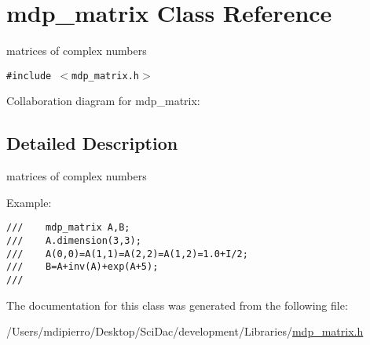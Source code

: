 \hypertarget{classmdp__matrix}{
\section{mdp\_\-matrix Class Reference}
\label{classmdp__matrix}
}
matrices of complex numbers  


{\tt \#include $<$mdp\_\-matrix.h$>$}

Collaboration diagram for mdp\_\-matrix:

\subsection{Detailed Description}
matrices of complex numbers 

Example: 

\footnotesize\begin{verbatim}
///    mdp_matrix A,B;
///    A.dimension(3,3);
///    A(0,0)=A(1,1)=A(2,2)=A(1,2)=1.0+I/2;
///    B=A+inv(A)+exp(A+5);
/// \end{verbatim}
\normalsize
 

The documentation for this class was generated from the following file:\begin{CompactItemize}
\item 
/Users/mdipierro/Desktop/SciDac/development/Libraries/\hyperlink{mdp__matrix_8h}{mdp\_\-matrix.h}\end{CompactItemize}
